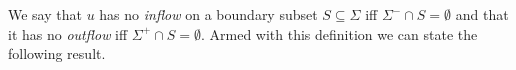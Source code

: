We say that $u$ has no \emph{inflow} on a boundary subset $S\subseteq\Sigma$ iff $\Sigma^-\cap S=\emptyset$ and
that it has no \emph{outflow} iff $\Sigma^+\cap S=\emptyset$.
Armed with this definition we can state the following result.

